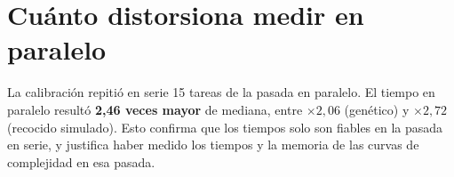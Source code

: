 \section{Cuánto distorsiona medir en paralelo}\label{sec:calibracion}

La calibración repitió en serie 15 tareas de la pasada en paralelo. El tiempo en paralelo resultó \textbf{2,46 veces mayor} de mediana, entre $\times 2{,}06$ (genético) y $\times 2{,}72$ (recocido simulado). Esto confirma que los tiempos solo son fiables en la pasada en serie, y justifica haber
medido los tiempos y la memoria de las curvas de complejidad en esa pasada.
